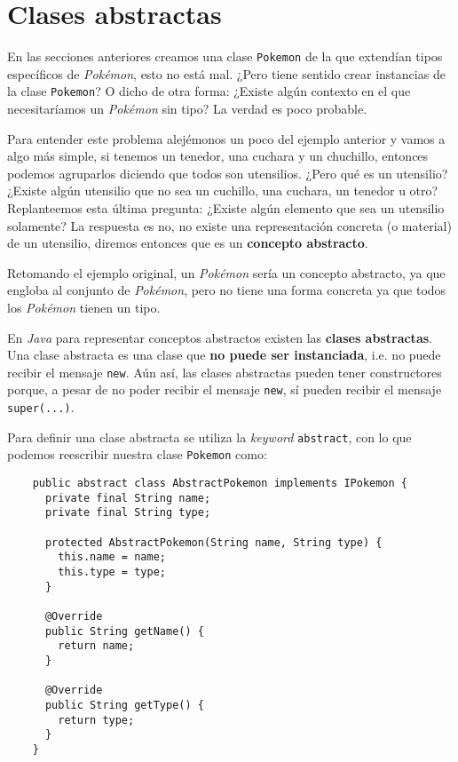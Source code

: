 \section{Clases abstractas}
  En las secciones anteriores creamos una clase \texttt{Pokemon} de la que extendían tipos 
  específicos de \textit{Pokémon}, esto no está mal.
  ¿Pero tiene sentido crear instancias de la clase \texttt{Pokemon}?
  O dicho de otra forma: ¿Existe algún contexto en el que necesitaríamos un \textit{Pokémon} sin 
  tipo?
  La verdad es poco probable.

  Para entender este problema alejémonos un poco del ejemplo anterior y vamos a algo más simple, si
  tenemos un tenedor, una cuchara y un chuchillo, entonces podemos agruparlos diciendo que todos son 
  utensilios.
  ¿Pero qué es un utensilio?
  ¿Existe algún utensilio que no sea un cuchillo, una cuchara, un tenedor u otro?
  Replanteemos esta última pregunta: ¿Existe algún elemento que sea un utensilio solamente?
  La respuesta es no, no existe una representación concreta (o material) de un utensilio, diremos
  entonces que es un \textbf{concepto abstracto}.

  Retomando el ejemplo original, un \textit{Pokémon} sería un concepto abstracto, ya que engloba al
  conjunto de \textit{Pokémon}, pero no tiene una forma concreta ya que todos los \textit{Pokémon}
  tienen un tipo.

  En \textit{Java} para representar conceptos abstractos existen las \textbf{clases abstractas}.
  Una clase abstracta es una clase que \textbf{no puede ser instanciada}, i.e. no puede recibir el
  mensaje \texttt{new}.
  Aún así, las clases abstractas pueden tener constructores porque, a pesar de no poder recibir el
  mensaje \texttt{new}, sí pueden recibir el mensaje \texttt{super(...)}.

  Para definir una clase abstracta se utiliza la \textit{keyword} \texttt{abstract}, con
  lo que podemos reescribir nuestra clase \texttt{Pokemon} como:

  \begin{verbatim}
    public abstract class AbstractPokemon implements IPokemon {
      private final String name;
      private final String type;

      protected AbstractPokemon(String name, String type) {
        this.name = name;
        this.type = type;
      }

      @Override
      public String getName() {
        return name;
      }

      @Override
      public String getType() {
        return type;
      }
    }
  \end{verbatim}
%
